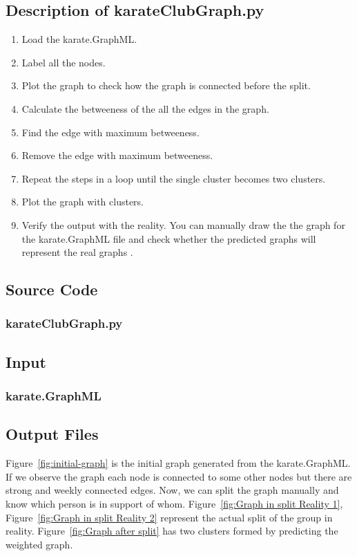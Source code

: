 \documentclass[12pt]{article}
\begin{document}
\subsection{Description of karateClubGraph.py}
\begin{enumerate}
	\item Load the karate.GraphML.
	\item Label all the nodes.
	\item Plot the graph to check how the graph is connected before the split.
	\item Calculate the betweeness of the all the edges in the graph.
	\item Find the edge with maximum betweeness.
	\item Remove the edge with maximum betweeness.
	\item Repeat the steps in a loop until the single cluster becomes two clusters.
	\item Plot the graph with clusters.
	\item Verify the output with the reality. You can manually draw the the graph for the karate.GraphML file and check whether the predicted graphs will represent the real graphs .	 
\end{enumerate}
 \newpage
\subsection{Source Code}
\subsubsection{karateClubGraph.py}

\newpage
\subsection{Input}
\subsubsection{karate.GraphML}

\newpage

\subsection{Output Files}
Figure~\ref{fig:initial-graph} is the initial graph generated from the karate.GraphML. If we observe the graph each node is connected to some other nodes but there are strong and weekly connected edges. Now, we can split the graph manually and know which person is in support of whom. Figure~\ref{fig:Graph in split Reality 1}, Figure~\ref{fig:Graph in split Reality 2} represent the actual split of the group in reality.
Figure~\ref{fig:Graph after split} has two clusters formed by predicting the weighted graph.
\end{document}
